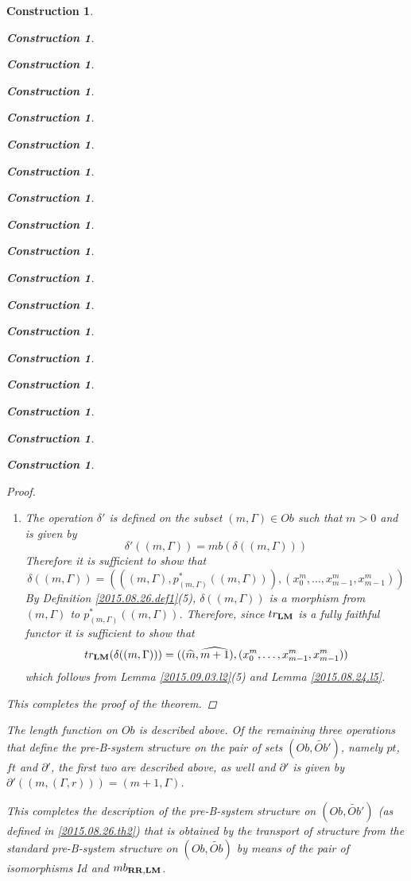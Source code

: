 \documentclass[12pt]{amsart}
\numberwithin{proposition}{subsection}
\newtheorem{construction}[proposition]{Construction}
\newcommand{\wt}{\widetilde}
\newcommand{\wh}{\widehat}
\newcommand{\RR}{{\bf RR}}
\newcommand{\LM}{{\bf LM}}
\begin{document}
\begin{construction}
\begin{construction}
\begin{construction}
\begin{construction}
\begin{construction}
\begin{construction}
\begin{construction}
\begin{construction}
\begin{construction}
\begin{construction}
\begin{construction}
\begin{construction}
\begin{construction}
\begin{construction}
\begin{construction}
\begin{construction}
\begin{construction}
\begin{construction}
\begin{proof}
\begin{enumerate}
\begin{equation*}
\begin{split}
    \wt{S}'((m,&(\Gamma,r)),(n,(\Gamma',s)))\\&=mb((mb^!(m,(\Gamma,r)))^*(mb^!((n,(\Gamma',s)))))]=mb(rr^*ss)\\&=
    mb((x_0^{n-1},\dots,x^{n-1}_{n-2},(qq^{n-m-1}(rr))(s)))\\&=(n-1,(rr^*((n+1,\Gamma')),(qq^{n-m-1}(rr))(s)))\\&=
    (n-1,(S'((m,(\Gamma,r)),(n+1,\Gamma'))),\theta_{m,n}(r,s)),
  \end{split}
\end{equation*}
where the third equality is by Lemma \ref{2015.09.03.l1} and the fifth by
(\ref{2016.01.21.eq2}) and the definition of $\theta_{m,n}(r,s)$.
%
\item The operation $\delta'$ is defined on the subset $(m,\Gamma)\in Ob$ such that $m>0$ and is given by
%
$$\delta'((m,\Gamma))=mb(\delta((m,\Gamma)))$$
%
Therefore it is sufficient to show that
%
$$\delta((m,\Gamma))=(((m,\Gamma),p_{(m,\Gamma)}^*((m,\Gamma))),(x_0^m,\dots,x_{m-1}^m,x_{m-1}^m))$$
%
By Definition \ref{2015.08.26.def1}(5), $\delta((m,\Gamma))$ is a morphism from
$(m,\Gamma)$ to $p_{(m,\Gamma)}^*((m,\Gamma))$. Therefore, since $tr_{\LM}$ is
a fully faithful functor it is sufficient to show that
%
$$tr_{\LM}(\delta((m,\Gamma)))=((\wh{m},\wh{m+1}),(x_0^m,\dots,x_{m-1}^m,x_{m-1}^m))$$
%
which follows from Lemma \ref{2015.09.03.l2}(5) and Lemma \ref{2015.08.24.l5}.
%
\end{enumerate}
%
This completes the proof of the theorem. 
\end{proof}
%
The length function on $Ob$ is described above. Of the remaining three
operations that define the pre-B-system structure on the pair of sets
$(Ob,\wt{Ob}')$, namely $pt$, $ft$ and $\partial'$, the first two are described above,
as well and $\partial'$ is given by $\partial'((m,(\Gamma,r)))=(m+1,\Gamma)$.

This completes the description of the pre-B-system structure on $(Ob,\wt{Ob}')$
(as defined in \ref{2015.08.26.th2})
that is obtained by the transport of structure from the standard pre-B-system
structure on $(Ob,\wt{Ob})$ by means of the pair of isomorphisms $Id$ and
$mb_{\RR,\LM}$.


\end{construction}
\end{construction}
\end{construction}
\end{construction}
\end{construction}
\end{construction}
\end{construction}
\end{construction}
\end{construction}
\end{construction}
\end{construction}
\end{construction}
\end{construction}
\end{construction}
\end{construction}
\end{construction}
\end{construction}
\end{construction}
\end{document}
